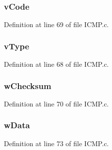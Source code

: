 \subsubsection[{v\+Code}]{ v\+Code}\label{struct_i_c_m_p___p_a_c_k_e_t_afa2682a4e854bff2bebfdd544b28cf27}


Definition at line 69 of file I\+C\+M\+P.\+c.

\hypertarget{struct_i_c_m_p___p_a_c_k_e_t_a3ba68f85c86b06e62ae281818ef865ea}{}
\subsubsection[{v\+Type}]{ v\+Type}\label{struct_i_c_m_p___p_a_c_k_e_t_a3ba68f85c86b06e62ae281818ef865ea}


Definition at line 68 of file I\+C\+M\+P.\+c.

\hypertarget{struct_i_c_m_p___p_a_c_k_e_t_a2675f57135275c1b6e32c45387be4e05}{}
\subsubsection[{w\+Checksum}]{ w\+Checksum}\label{struct_i_c_m_p___p_a_c_k_e_t_a2675f57135275c1b6e32c45387be4e05}


Definition at line 70 of file I\+C\+M\+P.\+c.

\hypertarget{struct_i_c_m_p___p_a_c_k_e_t_a3cd95b4fce590a248e15f498a2ac9d8f}{}
\subsubsection[{w\+Data}]{ w\+Data}\label{struct_i_c_m_p___p_a_c_k_e_t_a3cd95b4fce590a248e15f498a2ac9d8f}


Definition at line 73 of file I\+C\+M\+P.\+c.

